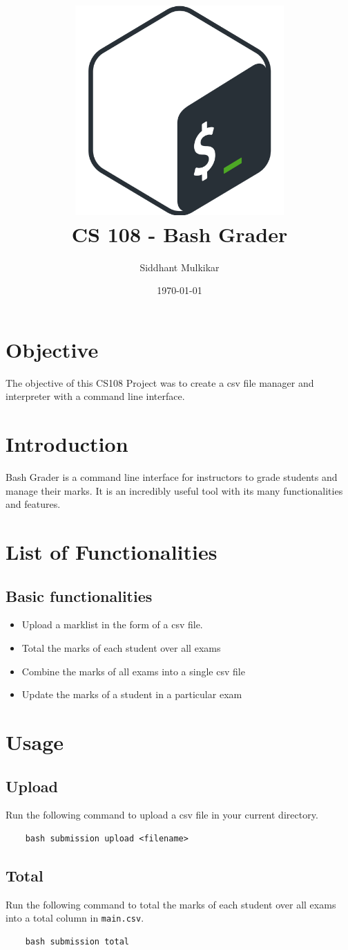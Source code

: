 \documentclass{article}
\title{\includegraphics[width=8cm]{bashlogo.png} \\[2cm] CS 108 - Bash Grader}
\author{Siddhant Mulkikar}
\date{\today}
\begin{document}
\maketitle
\newpage
\tableofcontents
\newpage

\section{Objective}
The objective of this CS108 Project was to create a csv file manager and interpreter with a command line interface.

\section{Introduction}
Bash Grader is a command line interface for instructors to grade students and manage their marks. It is an incredibly useful tool with its many functionalities and features. 

\section{List of Functionalities}
\subsection{Basic functionalities}
\begin{itemize}
    \item Upload a marklist in the form of a csv file.
    \item Total the marks of each student over all exams
    \item Combine the marks of all exams into a single csv file
    \item Update the marks of a student in a particular exam
\end{itemize}
\newpage
\section{Usage}
\subsection{Upload}
Run the following command to upload a csv file in your current directory.
\begin{verbatim}
    bash submission upload <filename>
\end{verbatim}


\subsection{Total}
Run the following command to total the marks of each student over all exams into a total column in \verb"main.csv".
\begin{Verbatim}
    bash submission total
\end{Verbatim}
\end{document}
